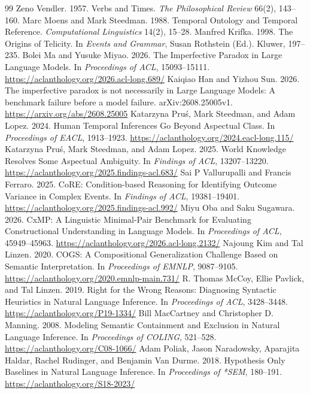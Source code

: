 \documentclass[sigconf,anonymous,review]{acmart}
\begin{document}
\begin{thebibliography}{99}
 Zeno Vendler. 1957. Verbs and Times. \emph{The Philosophical Review} 66(2), 143--160.
 Marc Moens and Mark Steedman. 1988. Temporal Ontology and Temporal Reference. \emph{Computational Linguistics} 14(2), 15--28.
 Manfred Krifka. 1998. The Origins of Telicity. In \emph{Events and Grammar}, Susan Rothstein (Ed.). Kluwer, 197--235.
 Bolei Ma and Yusuke Miyao. 2026. The Imperfective Paradox in Large Language Models. In \emph{Proceedings of ACL}, 15093--15111. \url{https://aclanthology.org/2026.acl-long.689/}
 Kaiqiao Han and Yizhou Sun. 2026. The imperfective paradox is not necessarily in Large Language Models: A benchmark failure before a model failure. arXiv:2608.25005v1. \url{https://arxiv.org/abs/2608.25005}
 Katarzyna Pru\'{s}, Mark Steedman, and Adam Lopez. 2024. Human Temporal Inferences Go Beyond Aspectual Class. In \emph{Proceedings of EACL}, 1913--1923. \url{https://aclanthology.org/2024.eacl-long.115/}
 Katarzyna Pru\'{s}, Mark Steedman, and Adam Lopez. 2025. World Knowledge Resolves Some Aspectual Ambiguity. In \emph{Findings of ACL}, 13207--13220. \url{https://aclanthology.org/2025.findings-acl.683/}
 Sai P Vallurupalli and Francis Ferraro. 2025. CoRE: Condition-based Reasoning for Identifying Outcome Variance in Complex Events. In \emph{Findings of ACL}, 19381--19401. \url{https://aclanthology.org/2025.findings-acl.992/}
 Miyu Oba and Saku Sugawara. 2026. CxMP: A Linguistic Minimal-Pair Benchmark for Evaluating Constructional Understanding in Language Models. In \emph{Proceedings of ACL}, 45949--45963. \url{https://aclanthology.org/2026.acl-long.2132/}
 Najoung Kim and Tal Linzen. 2020. COGS: A Compositional Generalization Challenge Based on Semantic Interpretation. In \emph{Proceedings of EMNLP}, 9087--9105. \url{https://aclanthology.org/2020.emnlp-main.731/}
 R. Thomas McCoy, Ellie Pavlick, and Tal Linzen. 2019. Right for the Wrong Reasons: Diagnosing Syntactic Heuristics in Natural Language Inference. In \emph{Proceedings of ACL}, 3428--3448. \url{https://aclanthology.org/P19-1334/}
 Bill MacCartney and Christopher D. Manning. 2008. Modeling Semantic Containment and Exclusion in Natural Language Inference. In \emph{Proceedings of COLING}, 521--528. \url{https://aclanthology.org/C08-1066/}
 Adam Poliak, Jason Naradowsky, Aparajita Haldar, Rachel Rudinger, and Benjamin Van Durme. 2018. Hypothesis Only Baselines in Natural Language Inference. In \emph{Proceedings of *SEM}, 180--191. \url{https://aclanthology.org/S18-2023/}

\end{thebibliography}
\end{document}
